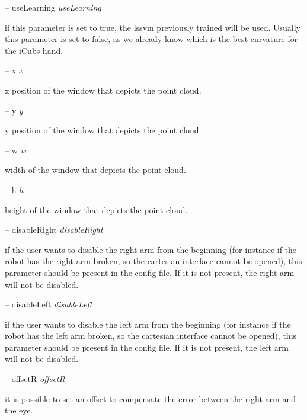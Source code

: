 -- use\+Learning {\itshape use\+Learning} 
\begin{DoxyItemize}
\item if this parameter is set to true, the lssvm previously trained will be used. Usually this parameter is set to false, as we already know which is the best curvature for the i\+Cub\textquotesingle{}s hand.
\end{DoxyItemize}

-- x {\itshape x} 
\begin{DoxyItemize}
\item x position of the window that depicts the point cloud.
\end{DoxyItemize}

-- y {\itshape y} 
\begin{DoxyItemize}
\item y position of the window that depicts the point cloud.
\end{DoxyItemize}

-- w {\itshape w} 
\begin{DoxyItemize}
\item width of the window that depicts the point cloud.
\end{DoxyItemize}

-- h {\itshape h} 
\begin{DoxyItemize}
\item height of the window that depicts the point cloud.
\end{DoxyItemize}

-- disable\+Right {\itshape disable\+Right} 
\begin{DoxyItemize}
\item if the user wants to disable the right arm from the beginning (for instance if the robot has the right arm broken, so the cartesian interface cannot be opened), this parameter should be present in the config file. If it is not present, the right arm will not be disabled.
\end{DoxyItemize}

-- disable\+Left {\itshape disable\+Left} 
\begin{DoxyItemize}
\item if the user wants to disable the left arm from the beginning (for instance if the robot has the left arm broken, so the cartesian interface cannot be opened), this parameter should be present in the config file. If it is not present, the left arm will not be disabled.
\end{DoxyItemize}

-- offsetR {\itshape offsetR} 
\begin{DoxyItemize}
\item it is possible to set an offset to compensate the error between the right arm and the eye.
\end{DoxyItemize}

